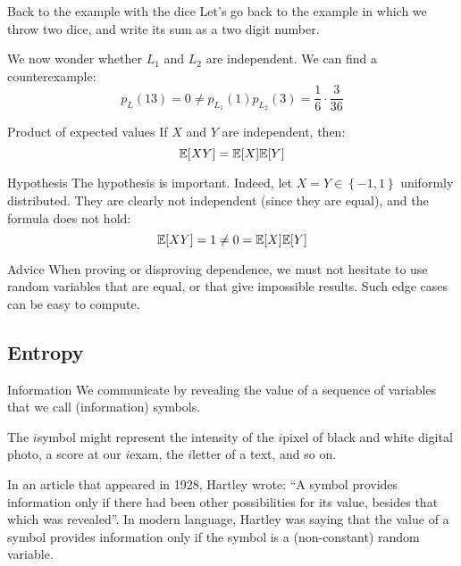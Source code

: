 \documentclass[a4paper]{article}
\begin{document}
\begin{parag}{Back to the example with the dice}
    Let's go back to the example in which we throw two dice, and write its sum as a two digit number.

    We now wonder whether $L_1$ and $L_2$ are independent. We can find a counterexample: 
    \[p_{L}\left(13\right) = 0 \neq p_{L_1}\left(1\right) p_{L_2}\left(3\right) = \frac{1}{6}\cdot \frac{3}{36}\]
\end{parag}

\begin{parag}{Product of expected values}
    If $X$ and $Y$ are independent, then: 
    \[\exval\left[XY\right] = \exval\left[X\right] \exval\left[Y\right]\]
    
    \begin{subparag}{Hypothesis}
        The hypothesis is important. Indeed, let $X = Y \in \left\{-1, 1\right\}$ uniformly distributed. They are clearly not independent (since they are equal), and the formula does not hold: 
        \[\exval\left[XY\right] = 1 \neq 0 = \exval\left[X\right]\exval\left[Y\right]\]
    \end{subparag}

    \begin{subparag}{Advice}
        When proving or disproving dependence, we must not hesitate to use random variables that are equal, or that give impossible results. Such edge cases can be easy to compute.
    \end{subparag}
\end{parag}

\subsection{Entropy}
\begin{parag}{Information}
    We communicate by revealing the value of a sequence of variables that we call (information) symbols.

    The $i$\Th symbol might represent the intensity of the $i$\Th pixel of black and white digital photo, a score at our $i$\Th exam, the $i$\Th letter of a text, and so on.

    In an article that appeared in 1928, Hartley wrote: ``A symbol provides information only if there had been other possibilities for its value, besides that which was revealed''. In modern language, Hartley was saying that the value of a symbol provides information only if the symbol is a (non-constant) random variable.
\end{parag}
\end{document}
